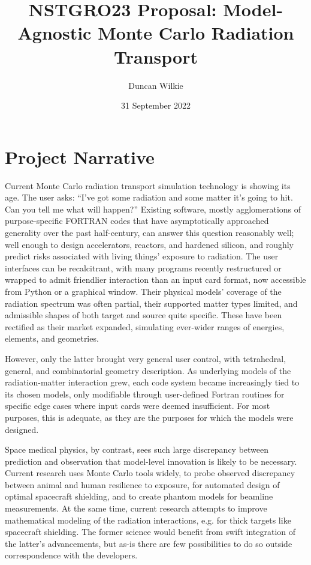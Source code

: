 \documentclass{article}
\title{NSTGRO23 Proposal: Model-Agnostic Monte Carlo Radiation Transport}
\author{Duncan Wilkie}
\date{31 September 2022}
\begin{document}
\maketitle

\section{Project Narrative}
\label{sec:project-narrative}

Current Monte Carlo radiation transport simulation technology is showing its age.
 The user asks: ``I've got some radiation and some matter it's going to hit. Can you tell me what will happen?'' %
Existing software, mostly agglomerations of purpose-specific FORTRAN codes that have asymptotically approached generality over the past half-century,
can answer this question reasonably well; well enough to design accelerators, reactors, and hardened silicon,
and roughly predict risks associated with living things' exposure to radiation.
The user interfaces can be recalcitrant, with many programs recently restructured or wrapped to admit friendlier interaction than an input card format,
now accessible from Python or a graphical window.
Their physical models' coverage of the radiation spectrum was often partial, their supported matter types limited,
and admissible shapes of both target and source quite specific.
These have been rectified as their market expanded, simulating ever-wider ranges of energies, elements, and geometries.

However, only the latter brought very general user control, with tetrahedral, general, and combinatorial geometry description.
As underlying models of the radiation-matter interaction grew, each code system became increasingly tied to its chosen models,
only modifiable through user-defined Fortran routines for specific edge cases where input cards were deemed insufficient.
For most purposes, this is adequate, as they are the purposes for which the models were designed.

Space medical physics, by contrast, sees such large discrepancy between prediction and observation that model-level innovation is likely to be necessary.
Current research uses Monte Carlo tools widely, to probe observed discrepancy between animal and human resilience to exposure,
for automated design of optimal spacecraft shielding, and to create phantom models for beamline measurements. %
At the same time, current research attempts to improve mathematical modeling of the radiation interactions, e.g. for thick targets like spacecraft shielding.
The former science would benefit from swift integration of the latter's advancements,
but as-is there are few possibilities to do so outside correspondence with the developers.
\end{document}
